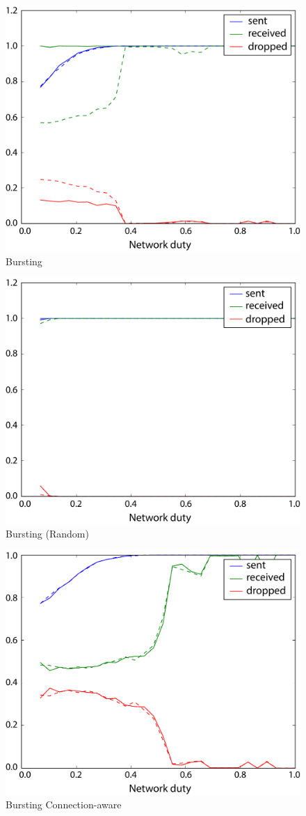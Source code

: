 \documentclass[a4paper, 11pt]{article}
\begin{document}
\begin{figure}[htbp]
	\centering
	\includegraphics[width=0.6\linewidth]{images/bursting.pdf}
	\caption{Bursting}	
\end{figure}

\begin{figure}[htbp]
	\centering
	\includegraphics[width=0.6\linewidth]{images/bursting_random.pdf}
	\caption{Bursting (Random)}	
\end{figure}

\begin{figure}[htbp]
	\centering
	\includegraphics[width=0.6\linewidth]{images/bursting_connaware.pdf}
	\caption{Bursting Connection-aware}	
\end{figure}
\end{document}
